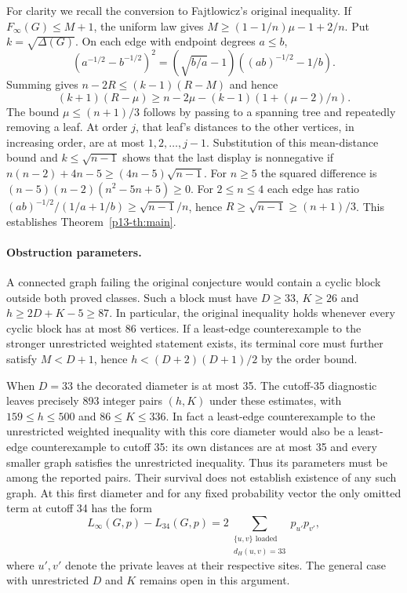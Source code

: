 \documentclass[11pt,a4paper]{article}
\begin{document}
For clarity we recall the conversion to Fajtlowicz's original inequality. If $F_\infty(G)\le M+1$, the uniform law gives $M\ge(1-1/n)\mu-1+2/n$. Put $k=\sqrt{\Delta(G)}$. On each edge with endpoint degrees $a\le b$,
\[
 (a^{-1/2}-b^{-1/2})^2=(\sqrt{b/a}-1)((ab)^{-1/2}-1/b).
\]
Summing gives $n-2R\le(k-1)(R-M)$ and hence
\[
 (k+1)(R-\mu)\ge n-2\mu-(k-1)(1+(\mu-2)/n).
\]
The bound $\mu\le(n+1)/3$ follows by passing to a spanning tree and repeatedly removing a leaf. At order $j$, that leaf's distances to the other vertices, in increasing order, are at most $1,2,\ldots,j-1$. Substitution of this mean-distance bound and $k\le\sqrt{n-1}$ shows that the last display is nonnegative if
$n(n-2)+4n-5\ge(4n-5)\sqrt{n-1}$. For $n\ge5$ the squared difference is $(n-5)(n-2)(n^2-5n+5)\ge0$. For $2\le n\le4$ each edge has ratio $(ab)^{-1/2}/(1/a+1/b)\ge\sqrt{n-1}/n$, hence $R\ge\sqrt{n-1}\ge(n+1)/3$. This establishes Theorem~\ref{p13-th:main}.

\paragraph{Obstruction parameters.}
A connected graph failing the original conjecture would contain a cyclic block outside both proved classes. Such a block must have $D\ge33$, $K\ge26$ and $h\ge2D+K-5\ge87$. In particular, the original inequality holds whenever every cyclic block has at most 86 vertices. If a least-edge counterexample to the stronger unrestricted weighted statement exists, its terminal core must further satisfy $M<D+1$, hence $h<(D+2)(D+1)/2$ by the order bound.

When $D=33$ the decorated diameter is at most 35. The cutoff-35 diagnostic leaves precisely 893 integer pairs $(h,K)$ under these estimates, with $159\le h\le500$ and $86\le K\le336$. In fact a least-edge counterexample to the unrestricted weighted inequality with this core diameter would also be a least-edge counterexample to cutoff 35: its own distances are at most 35 and every smaller graph satisfies the unrestricted inequality. Thus its parameters must be among the reported pairs. Their survival does not establish existence of any such graph. At this first diameter and for any fixed probability vector the only omitted term at cutoff 34 has the form
\[
 L_\infty(G,p)-L_{34}(G,p)
 =2\!\sum_{\substack{\{u,v\}\text{ loaded}\\d_H(u,v)=33}}p_{u'}p_{v'},
\]
where $u',v'$ denote the private leaves at their respective sites. The general case with unrestricted $D$ and $K$ remains open in this argument.
\end{document}
